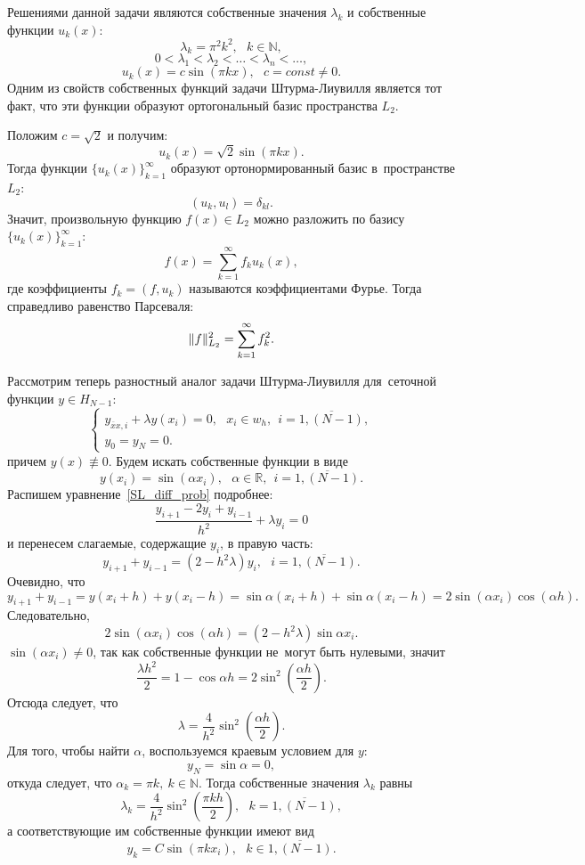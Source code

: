 \documentclass[11pt,a4paper,twoside,listtotoc,bibtotoc]{report}
\numberwithin{equation}{section}
\theoremstyle{definition}
\theoremstyle{plain}
\DeclarePairedDelimiter\norm{\lVert}{\rVert}
\begin{document}
Решениями данной задачи являются собственные значения $\lambda_k$ и собственные
функции $u_k(x)$:
%
$$
    \lambda_k = \pi^2k^2, ~~~k\in\mathbb{N},
$$
%
$$
    0 < \lambda_1 < \lambda_2 < \ldots < \lambda_n < \ldots,
$$
%
$$
    u_k(x) = c \sin(\pi k x), ~~~c = const \neq 0.
$$
%
Одним из свойств собственных функций задачи Штурма-Лиувилля
является тот факт, что эти функции образуют ортогональный базис
пространства $L_2$.

Положим $c = \sqrt{2}$ и получим:
%
$$
    u_k(x) = \sqrt{2}\sin(\pi kx).
$$
%
Тогда функции $\{u_k(x)\}_{k=1}^{\infty}$ образуют ортонормированный
базис в~пространстве $L_2$:
%
$$
    (u_k, u_l) = \delta_{kl}.
$$
%
Значит, произвольную функцию $f(x) \in L_2$ можно разложить по базису
$\{u_k(x)\}_{k=1}^{\infty}$:
%
$$
    f(x) = \sum_{k=1}^{\infty} f_k u_k(x),
$$
%
где коэффициенты $f_k = (f,u_k)$ называются коэффициентами Фурье.
Тогда справедливо равенство Парсеваля:
%
$$
    \norm{f}_{L_2}^2 = \sum_{k=1}^{\infty} f_k^2.
$$
%

Рассмотрим теперь разностный аналог задачи Штурма-Лиувилля для~сеточной
функции $y\in H_{N-1}$:
%
\begin{equation}
%
    \begin{cases}
        \label{SL_diff_prob}
        y_{\overline{x}x,i} + \lambda y(x_i) = 0,
        ~~~x_i \in w_h, ~~i=\overline{1, (N-1)}, \\
        y_0 = y_N = 0.
    \end{cases}
%
\end{equation}
%
причем $y(x) \not\equiv 0.$
Будем искать собственные функции в виде
%
$$
    y(x_i) = \sin(\alpha x_i), ~~~\alpha\in\mathbb{R}, ~~i=\overline{1, (N-1)}.
$$
%
Распишем уравнение~\eqref{SL_diff_prob} подробнее:
%
$$
    \frac{y_{i+1} - 2y_i + y_{i-1}}{h^2} + \lambda y_i = 0
$$
%
и перенесем слагаемые, содержащие $y_i$, в правую часть:
%
$$
    y_{i+1} + y_{i-1} = \left(2 - h^2\lambda\right)y_i, ~~~i = \overline{1, (N-1)}.
$$
%
Очевидно, что
%
$$
    y_{i+1} + y_{i-1} = y(x_i + h) + y(x_i - h) = \sin\alpha(x_i + h) +
    \sin\alpha(x_i - h) = 2\sin(\alpha x_i) \cos(\alpha h).
$$
%
Следовательно,
%
$$
    2\sin(\alpha x_i) \cos(\alpha h) = (2 - h^2\lambda) \sin\alpha x_i.
$$
%
$\sin(\alpha x_i) \neq 0$, так как собственные функции
не~могут быть нулевыми, значит
%
$$
    \frac{\lambda h^2}{2} = 1 - \cos \alpha h =
    2 \sin^2\left(\frac{\alpha h}{2}\right).
$$
%
Отсюда следует, что
%
$$
    \lambda = \frac{4}{h^2} \sin^2 \left(\frac{\alpha h}{2}\right).
$$
%
Для того, чтобы найти $\alpha$, воспользуемся краевым условием для $y$:
%
$$
    y_N = \sin \alpha = 0,
$$
%
откуда следует, что $\alpha_k = \pi k, ~k\in\mathbb{N}$.
Тогда собственные значения $\lambda_k$ равны
%
$$
    \lambda_k = \frac{4}{h^2} \sin^2\left(\frac{\pi k h}{2}\right), ~~~k = \overline{1, (N-1)},
$$
%
а соответствующие им собственные функции имеют вид
%
$$
    y_k = C \sin(\pi k x_i), ~~~k \in \overline{1, (N-1)}.
$$
%
\end{document}
